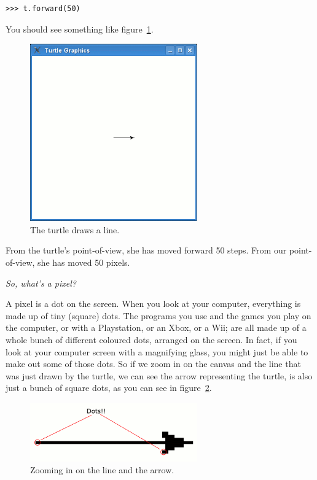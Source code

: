\begin{listing}
\begin{verbatim}
>>> t.forward(50)
\end{verbatim}
\end{listing}

You should see something like figure~\ref{fig11}.

\begin{figure}
\begin{center}
\includegraphics[width=72mm]{eps/figure11.eps}
\end{center}
\caption{The turtle draws a line.}\label{fig11}
\end{figure}

From the turtle's point-of-view, she has moved forward 50 steps.  From our point-of-view, she has moved 50 pixels.

\noindent
\emph{So, what's a pixel?}

A pixel is a dot on the screen.  When you look at your computer, everything is made up of tiny (square) dots.  The programs you use and the games you play on the computer, or with a Playstation, or an Xbox, or a Wii; are all made up of a whole bunch of different coloured dots, arranged on the screen.  In fact, if you look at your computer screen with a magnifying glass, you might just be able to make out some of those dots. So if we zoom in on the canvas and the line that was just drawn by the turtle, we can see the arrow representing the turtle, is also just a bunch of square dots, as you can see in figure~\ref{fig12}.

\begin{figure}
\begin{center}
\includegraphics[width=72mm]{eps/figure12.eps}
\end{center}
\caption{Zooming in on the line and the arrow.}\label{fig12}
\end{figure}

